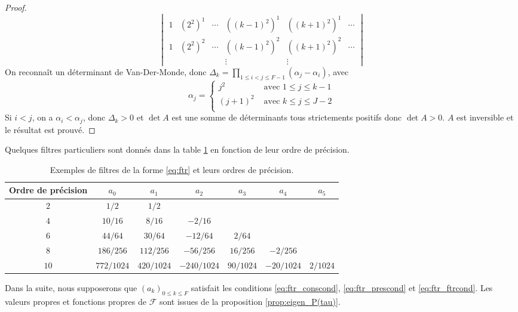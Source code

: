 \begin{proof}
\begin{equation}
\begin{vmatrix}
1 & (2^2)^1 & \cdots & ((k-1)^2)^1 & ((k+1)^2)^1 & \cdots\\
1 & (2^2)^2 & \cdots & ((k-1)^2)^2 & ((k+1)^2)^2 & \cdots\\
&&& \vdots &  \vdots &
\end{vmatrix}
\end{equation}
On reconnaît un déterminant de Van-Der-Monde, donc $\Delta_k = \prod_{1 \leq i < j \leq F-1} \left( \alpha_j - \alpha_i \right)$, avec 
\begin{equation}
\alpha_j = \left\lbrace
\begin{array}{ll}
j^2 & \text{ avec } 1 \leq j \leq k-1\\
(j+1)^2 & \text{ avec } k \leq j \leq J-2\\
\end{array}
\right.
\end{equation}
Si $i<j$, on a $\alpha_i < \alpha_j$, donc $\Delta_k>0$ et $\det A$ est une somme de déterminants tous strictements positifs donc $\det A > 0$. $A$ est inversible et le résultat est prouvé.
\end{proof}
Quelques filtres particuliers sont donnés dans la table \ref{tab:filter} en fonction de leur ordre de précision.
\begin{table}[htbp]
\begin{center}
\begin{tabular}{|c||cccccc|}
\hline
\textbf{Ordre de précision} & $a_0$ & $a_1$ & $a_2$ & $a_3$ & $a_4$ & $a_5$ \\
\hline \hline
$2$ & $1/2$ & $1/2$ & & & & \\
\hline
$4$ & $10/16$ & $8/16$ & $-2/16$ & & & \\
\hline
$6$ & $44/64$ & $30/64$ & $-12/64$ & $2/64$ & & \\
\hline
$8$ & $186/256$ & $112/256$ & $-56/256$ & $16/256$ & $-2/256$ & \\
\hline
$10$ & $772/1024$ & $420/1024$ & $-240/1024$ & $90/1024$ & $-20/1024$ & $2/1024$ \\
\hline
\end{tabular}
\end{center}
\caption{Exemples de filtres de la forme \eqref{eq:ftr} et leurs ordres de précision.}
\label{tab:filter}
\end{table}
Dans la suite, nous supposerons que $(a_k)_{0 \leq k \leq F}$ satisfait les conditions \eqref{eq:ftr_conscond}, \eqref{eq:ftr_prescond} et \eqref{eq:ftr_ftrcond}.
Les valeurs propres et fonctions propres de $\mathcal{F}$ sont issues de la proposition \ref{prop:eigen_P(tau)}.

